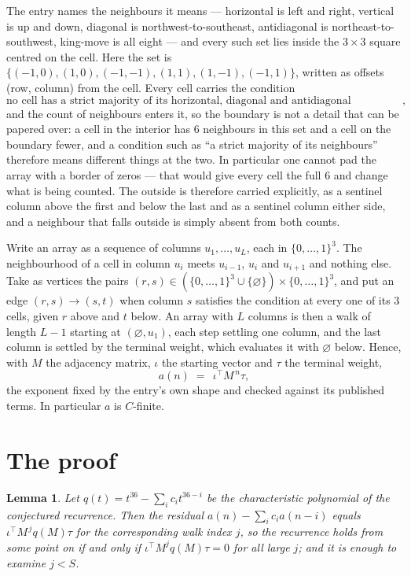 \documentclass[11pt,a4paper]{article}
\theoremstyle{plain}
\newtheorem{lemma}[theorem]{Lemma}
\theoremstyle{definition}
\begin{document}
The entry names the neighbours it means --- horizontal is left and right, vertical is up and
down, diagonal is northwest-to-southeast, antidiagonal is northeast-to-southwest, king-move is
all eight --- and every such set lies inside the $3\times3$ square centred on the cell. Here
the set is $\{(-1,0), (1,0), (-1,-1), (1,1), (1,-1), (-1,1)\}$, written as offsets (row, column) from the cell. Every cell carries
the condition
\[
\text{no cell has a strict majority of its horizontal, diagonal and antidiagonal neighbours equal to 1},
\]
and the count of neighbours enters it, so the boundary is not a detail that can be papered
over: a cell in the interior has $6$ neighbours in this set and a cell on the boundary
fewer, and a condition such as ``a strict majority of its neighbours'' therefore means
different things at the two. In particular one cannot pad the array with a border of zeros ---
that would give every cell the full $6$ and change what is being counted. The outside is
therefore carried
explicitly, as a sentinel column above the first and below the last and as a sentinel column
either side, and a neighbour that falls outside is simply absent from both counts.

Write an array as a sequence of columns $u_1,\dots,u_L$, each in
$\{0,\dots,1\}^{3}$. The neighbourhood of a cell in column $u_i$ meets $u_{i-1}$,
$u_i$ and $u_{i+1}$ and nothing else. Take as vertices the pairs
$(r,s)\in(\{0,\dots,1\}^{3}\cup\{\varnothing\})\times\{0,\dots,1\}^{3}$,
and put an edge $(r,s)\to(s,t)$ when column $s$ satisfies the condition at every one of its
$3$ cells, given $r$ above and $t$ below. An array with $L$ columns is then a walk of length
$L-1$ starting at $(\varnothing,u_1)$, each step settling one column, and the last column is
settled by the terminal weight, which evaluates it with $\varnothing$ below. Hence,
with $M$ the adjacency matrix, $\iota$ the starting vector and $\tau$ the terminal weight,
\[
a(n)\;=\;\,\iota^{\!\top}M^{\,n}\tau ,
\]
the exponent fixed by the entry's own shape and checked against its published terms. In
particular $a$ is $C$-finite.

\section{The proof}

\begin{lemma}\label{lem:crit}
Let $q(t)=t^{36}-\sum_i c_it^{36-i}$ be the characteristic polynomial of the
conjectured recurrence. Then the residual $a(n)-\sum_ic_ia(n-i)$ equals
$\iota^{\!\top}M^{\,j}q(M)\tau$ for the corresponding walk index $j$, so the
recurrence holds from some point on if and only if $\iota^{\!\top}M^{j}q(M)\tau=0$ for all
large $j$; and it is enough to examine $j<S$.
\end{lemma}
\end{document}
